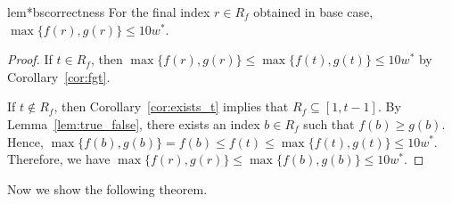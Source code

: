 \documentclass[english,a4paper, cleveref, autoref, thm-restate, nolineno]{socg-lipics-v2021}
\theoremstyle{star}
\theoremstyle{claimstar}
\begin{document}
\begin{restatable}{lem*}{bscorrectness}
    \label{lem:bs_correctness}
    For the final index  $r\in R_f$ obtained in base case, $\max \{ f(r), g(r) \} \le 10 w^*$. 
\end{restatable}


\begin{proof}
    If $t \in R_f$, then $\max \{ f(r), g(r) \} \le \max \{ f(t), g(t) \} \le 10 w^*$ by Corollary~\ref{cor:fgt}.  

    If $t \notin R_f$, then Corollary~\ref{cor:exists_t} implies that $R_f \subseteq [1, t-1]$.  
    By Lemma~\ref{lem:true_false}, there exists an index $b \in R_f$ such that $f(b) \ge g(b)$.  
    Hence, $\max \{ f(b), g(b) \} = f(b) \le f(t) \le \max \{ f(t), g(t) \} \le 10 w^*$.  
    Therefore, we have $\max \{ f(r), g(r) \} \le \max \{ f(b), g(b) \} \le 10 w^*$.
\end{proof}

Now we show the following theorem.

\tenapx*
\end{document}
